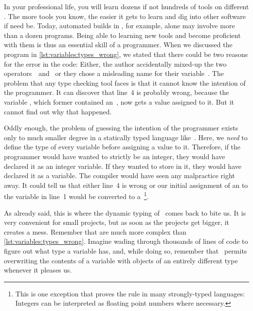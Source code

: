 %
In your professional life, you will learn dozens if not hundreds of tools on different .
The more tools you know, the easier it gets to learn and dig into other software if need be.
Today, automated builds in , for example, alone may involve more than a dozen programs.
Being able to learning new tools and become proficient with them is thus an essential skill of a programmer.%
%
\endhsection%
%
%
\label{sec:varTypeHints}%
%
When we discussed the program  in \cref{lst:variables:types_wrong}, we stated that there could be two reasons for the error in the code:
Either, the author accidentally mixed-up the two operators~\pythonilIdx{/}~and~\pythonilIdx{//} or they chose a misleading name for their variable~.
The problem that any type checking tool faces is that it cannot know the intention of the programmer.
It can discover that line~4 is probably wrong, because the variable , which former contained an~, now gets a  value assigned to it.
But it cannot find out why that happened.

Oddly enough, the problem of guessing the intention of the programmer exists only to much smaller degree in a statically typed language like~.
Here, we \emph{need} to define the type of every variable before assigning a value to it.
Therefore, if the programmer would have wanted  to strictly be an integer, they would have declared it as an integer variable.
If they wanted to store  in it, they would have declared it as a  variable.
The compiler would have seen any malpractice right away.
It could tell us that either line~4 is wrong or our initial assignment of an  to the variable in line~1 would be converted to a~\footnote{%
This is one exception that proves the rule in many strongly-typed languages: %
Integers can be interpreted as floating point numbers where necessary.%
}.

As already said, this is where the dynamic typing of \python\ comes back to bite us.
It is very convenient for small projects, but as soon as the projects get bigger, it creates a mess.
Remember that  are much more complex than \cref{lst:variables:types_wrong}.
Imagine wading through thousands of lines of code to figure out what type a variable has, and, while doing so, remember that \python\ permits overwriting the contents of a variable with objects of an entirely different type whenever it pleases us.

